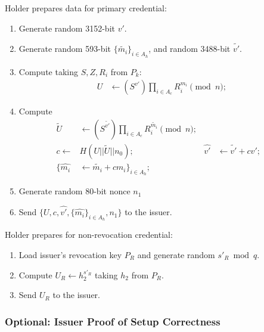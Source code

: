 \documentclass[a4paper]{article}
\begin{document}
Holder prepares data for primary credential:
\begin{enumerate}
\item Generate random 3152-bit $v'$.
\item Generate random 593-bit $\{\widetilde{m_i}
\}_{i \in A_h}$, and random 3488-bit $\widetilde{v'}$.
\item Compute taking $S,Z,R_i$ from $P_k$:
\begin{align}
U& \leftarrow (S^{v'}) \prod_{i \in A_c}{R_i^{m_i}} \pmod{n};
\end{align}
\item Compute
\begin{align}
\widetilde{U}&\leftarrow (S^{\widetilde{v'}}) \prod_{i \in A_c}{R_i^{\widetilde{m_i}}}\pmod{n};
&%
\\
c\leftarrow& H(U||\widetilde{U}||
n_0);&
\widehat{v'}&\leftarrow \widetilde{v'} + c v';&\\
\{\widehat{m_i}&\leftarrow \widetilde{m_i} + c m_i\}_{i \in A_h};&
\end{align}
\item Generate random 80-bit nonce $n_1$
\item Send $
\{U, c,\widehat{v'}, \{
\widehat{m_i}
\}_{i \in A_h}, n_1\}$ to the issuer.
\end{enumerate}
Holder prepares for non-revocation credential:
\begin{enumerate}
    \item Load issuer's revocation key $P_R$ and generate random $s'_R\bmod{q}$.
     \item Compute $U_R \leftarrow h_2^{s'_R}$
taking $h_2$ from $P_R$.
\item Send $U_R$ to the issuer.
\end{enumerate}


\subsubsection{Optional: Issuer Proof of Setup Correctness}
\end{document}
